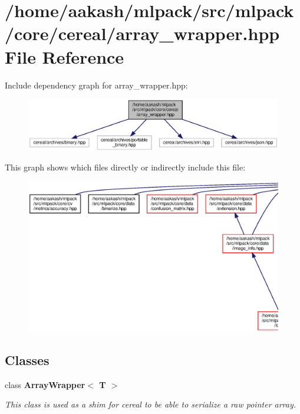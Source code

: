\section{/home/aakash/mlpack/src/mlpack/core/cereal/array\+\_\+wrapper.hpp File Reference}
\label{array__wrapper_8hpp}
Include dependency graph for array\+\_\+wrapper.\+hpp\+:
\nopagebreak
\begin{figure}[H]
\begin{center}
\leavevmode
\includegraphics[width=350pt]{array__wrapper_8hpp__incl}
\end{center}
\end{figure}
This graph shows which files directly or indirectly include this file\+:
\nopagebreak
\begin{figure}[H]
\begin{center}
\leavevmode
\includegraphics[width=350pt]{array__wrapper_8hpp__dep__incl}
\end{center}
\end{figure}
\subsection*{Classes}
\begin{DoxyCompactItemize}
\item 
class \textbf{ Array\+Wrapper$<$ T $>$}
\begin{DoxyCompactList}\small\item\em This class is used as a shim for cereal to be able to serialize a raw pointer array. \end{DoxyCompactList}\end{DoxyCompactItemize}
